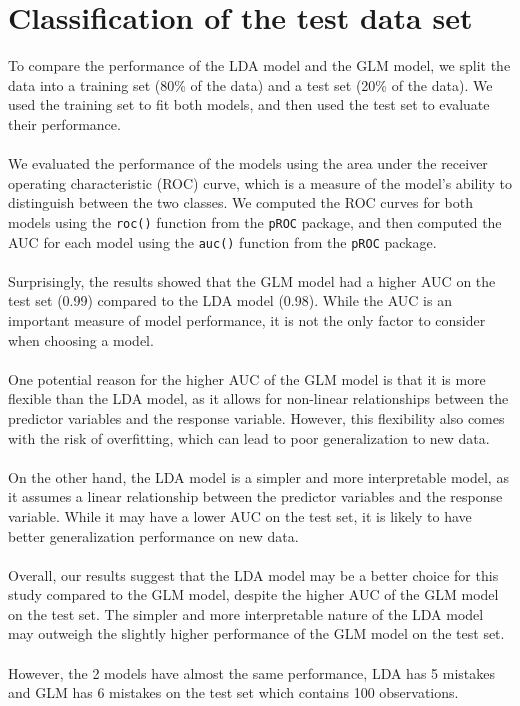 \section{Classification of the test data set}
To compare the performance of the LDA model and the GLM model, we split the data into a training set (80\% of the data) and a test set (20\% of the data). We used the training set to fit both models, and then used the test set to evaluate their performance.
\\\\
We evaluated the performance of the models using the area under the receiver operating characteristic (ROC) curve, which is a measure of the model's ability to distinguish between the two classes. We computed the ROC curves for both models using the \verb|roc()| function from the \verb|pROC| package, and then computed the AUC for each model using the \verb|auc()| function from the \verb|pROC| package.
\\\\
Surprisingly, the results showed that the GLM model had a higher AUC on the test set (0.99) compared to the LDA model (0.98). While the AUC is an important measure of model performance, it is not the only factor to consider when choosing a model.
\\\\
One potential reason for the higher AUC of the GLM model is that it is more flexible than the LDA model, as it allows for non-linear relationships between the predictor variables and the response variable. However, this flexibility also comes with the risk of overfitting, which can lead to poor generalization to new data.
\\\\
On the other hand, the LDA model is a simpler and more interpretable model, as it assumes a linear relationship between the predictor variables and the response variable. While it may have a lower AUC on the test set, it is likely to have better generalization performance on new data.
\\\\
Overall, our results suggest that the LDA model may be a better choice for this study compared to the GLM model, despite the higher AUC of the GLM model on the test set. The simpler and more interpretable nature of the LDA model may outweigh the slightly higher performance of the GLM model on the test set. 
\\\\
However, the 2 models have almost the same performance, LDA has 5 mistakes and GLM has 6 mistakes on the test set which contains 100 observations.